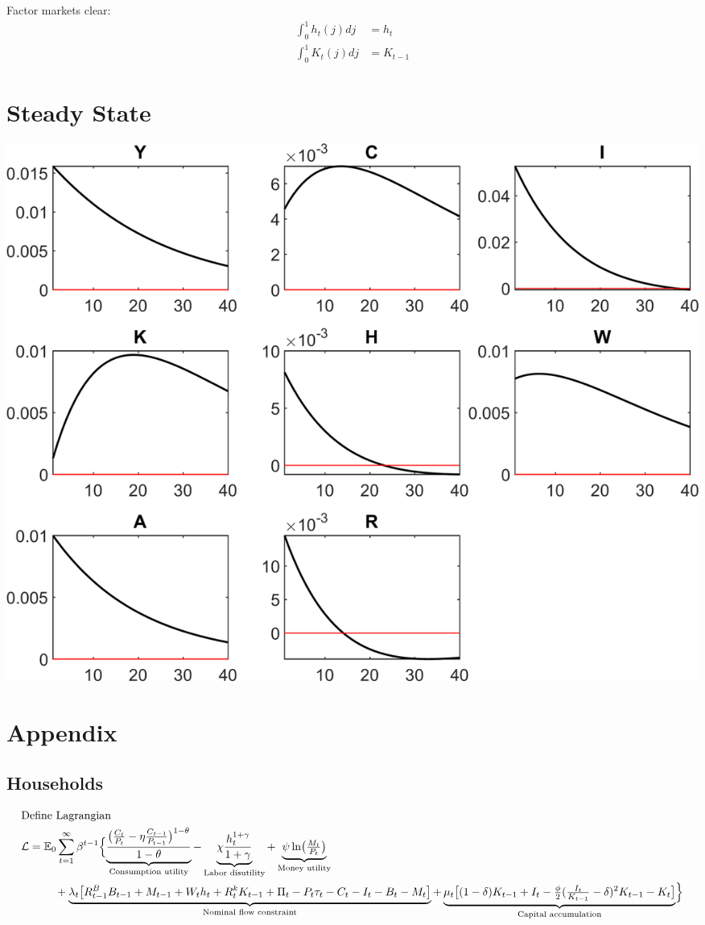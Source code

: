 \documentclass[11pt,preprint]{elsarticle}
\let\origfigure\figure
\let\endorigfigure\endfigure
\renewenvironment{figure}[1][2] {
    \expandafter\origfigure\expandafter[H]
} {
    \endorigfigure
}
\numberwithin{equation}{section}
\numberwithin{figure}{section}
\numberwithin{table}{section}
\begin{document}
Factor markets clear: \begin{align}
\int_0^1 h_t(j) dj &= h_t \\
\int_0^1 K_t(j) dj &= K_{t-1}
\end{align}

\section{Steady State}\label{steady-state}

\begin{figure}
\centering
\includegraphics{code/rbc_model/rbc_model/graphs/rbc_model_IRF_eps_cropped.png}
\caption{image}
\end{figure}

\newpage
\newpage

\section{Appendix}\label{appendix}

\subsection{Households}\label{households-1}

\begin{align*}
  & \text{Define Lagrangian} \\
  & \mathcal{L} = \mathbb{E}_0 \sum_{t=1}^{\infty} \beta^{t-1} \Bigl\{
    \underbrace{\frac{\bigl(\tfrac{C_t}{P_t}-\eta\tfrac{C_{t-1}}{P_{t-1}}\bigr)^{1-\theta}}{1-\theta}}_{\text{Consumption utility}}
    - \underbrace{\chi\frac{h_t^{1+\gamma}}{1+\gamma}}_{\text{Labor disutility}}
    + \underbrace{\psi\ln\bigl(\tfrac{M_t}{P_t}\bigr)}_{\text{Money utility}} \\
  & \quad\qquad
    + \underbrace{\lambda_t\bigl[R^B_{t-1}B_{t-1}+M_{t-1}+W_th_t+R^k_tK_{t-1}+\Pi_t-P_t\tau_t-C_t-I_t-B_t-M_t\bigr]}_{\text{Nominal flow constraint}}
    + \underbrace{\mu_t\bigl[(1-\delta)K_{t-1}+I_t-\tfrac{\phi}{2}(\tfrac{I_t}{K_{t-1}}-\delta)^2K_{t-1}-K_t\bigr]}_{\text{Capital accumulation}}
  \Bigr\}
\end{align*}
\end{document}
